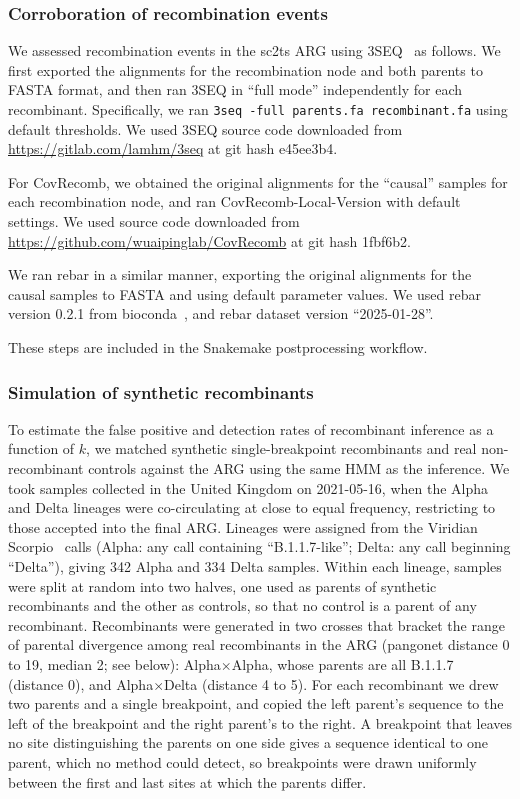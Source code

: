 \documentclass[12pt]{article}
\begin{document}
\subsubsection*{Corroboration of recombination events}

We assessed recombination events in the sc2ts ARG
using 3SEQ~\cite{Lam2018improved} as follows.
We first exported the alignments for the recombination node and both
parents to FASTA format, and then ran 3SEQ in ``full mode''
independently for each recombinant. Specifically, we
ran \texttt{3seq -full parents.fa recombinant.fa}
using default thresholds.
We used 3SEQ source code downloaded from \url{https://gitlab.com/lamhm/3seq}
at git hash e45ee3b4.

For CovRecomb\cite{Li2024CovRecomb}, we obtained the original alignments
for the ``causal'' samples for each recombination node, and ran
CovRecomb-Local-Version with default settings. We used source code
downloaded from \url{https://github.com/wuaipinglab/CovRecomb} at
git hash 1fbf6b2.

We ran rebar in a similar manner, exporting the original alignments for the
causal samples to FASTA and using default parameter values. We used
rebar version 0.2.1 from bioconda~\cite{Gruning2018bioconda}, and
rebar dataset version ``2025-01-28''.

These steps are included in the Snakemake postprocessing
workflow. %

\subsubsection*{Simulation of synthetic recombinants}
To estimate the false positive and detection rates of recombinant
inference as a function of $k$, we matched synthetic
single-breakpoint recombinants and real non-recombinant controls
against the ARG using the same HMM as the inference.
We took samples collected in the United Kingdom on 2021-05-16,
when the Alpha and Delta lineages were co-circulating at
close to equal frequency, restricting to those accepted into the final ARG.
Lineages were assigned from the Viridian Scorpio~\cite{Colquhoun2023scorpio}
calls (Alpha: any call containing ``B.1.1.7-like''; Delta: any call beginning ``Delta''),
giving 342 Alpha and 334 Delta samples.
Within each lineage, samples were split at random into two halves,
one used as parents of synthetic recombinants and the other as controls,
so that no control is a parent of any recombinant.
Recombinants were generated in two crosses that bracket the range
of parental divergence among real recombinants in the ARG
(pangonet distance 0 to 19, median 2; see below):
Alpha$\times$Alpha, whose parents are all B.1.1.7 (distance 0),
and Alpha$\times$Delta (distance 4 to 5).
For each recombinant we drew two parents and a single breakpoint,
and copied the left parent's sequence to the left of the breakpoint
and the right parent's to the right.
A breakpoint that leaves no site distinguishing the parents on one side
gives a sequence identical to one parent, which no method could detect,
so breakpoints were drawn uniformly between the first and last
sites at which the parents differ.
\end{document}
